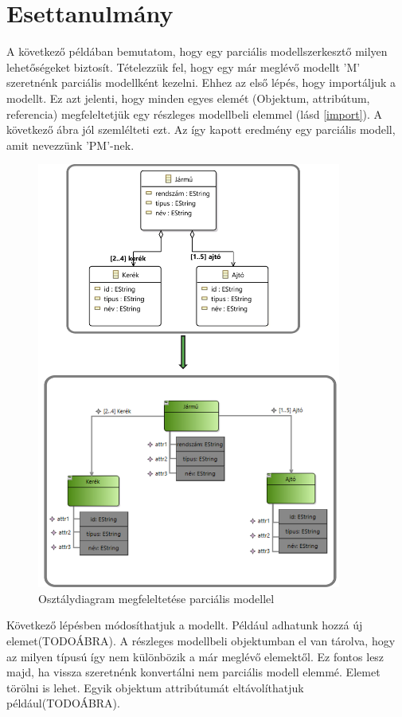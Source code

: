 \section{Esettanulmány}
A következő példában bemutatom, hogy egy parciális modellszerkesztő milyen lehetőségeket biztosít. Tételezzük fel, hogy egy már meglévő modellt 'M' szeretnénk parciális modellként kezelni. Ehhez az első lépés, hogy importáljuk a modellt. Ez azt jelenti, hogy minden egyes elemét (Objektum, attribútum, referencia) megfeleltetjük egy részleges modellbeli elemmel (lásd \autoref{import}). A következő ábra jól szemlélteti ezt. Az így kapott eredmény egy parciális modell, amit nevezzünk 'PM'-nek.
\begin{figure}[!ht]
	\centering
	\includegraphics[width=100mm]{figures/pl01.pdf}
	\caption{Osztálydiagram megfeleltetése parciális modellel} 
	\label{import}
\end{figure}
\par
Következő lépésben módosíthatjuk a modellt. Például adhatunk hozzá új elemet(TODOÁBRA). A részleges modellbeli objektumban el van tárolva, hogy az milyen típusú így nem különbözik a már meglévő elemektől. Ez fontos lesz majd, ha vissza szeretnénk konvertálni nem parciális modell elemmé. Elemet törölni is lehet. Egyik objektum attribútumát eltávolíthatjuk például(TODOÁBRA).
